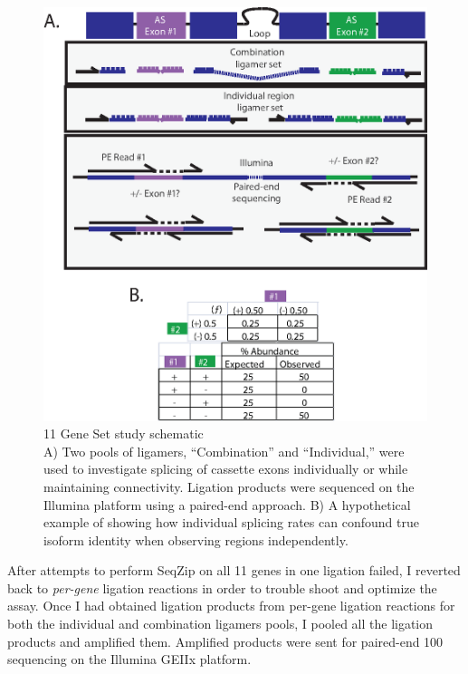   \begin{figure} %
    \centering 
    \includegraphics{Figures/SeqZipMethod/10GeneSetSchematic.eps}
    \caption[10 Gene Set study schematic]
    {
      11 Gene Set study schematic\\[0.25cm]
      A) Two pools of ligamers, ``Combination'' and ``Individual,'' were used to investigate splicing of cassette exons individually or while maintaining connectivity. Ligation products were sequenced on the Illumina platform using a paired-end approach. B) A hypothetical example of showing how individual splicing rates can confound true isoform identity when observing regions independently.
	    }
    \label{SeqZipMethod:fig:Multiplex Study Design}
  	\end{figure}

  After attempts to perform SeqZip on all 11 genes in one ligation failed, I reverted back to \textit{per-gene} ligation reactions in order to trouble shoot and optimize the assay. Once I had obtained ligation products from per-gene ligation reactions for both the individual and combination ligamers pools, I pooled all the ligation products and amplified them. Amplified products were sent for paired-end 100 sequencing on the Illumina GEIIx platform. 

